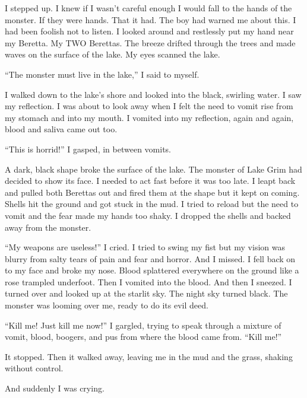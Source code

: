 I stepped up. I knew if I wasn't careful enough I would fall
to the hands of the monster. If they were hands. That it had. The
boy had warned me about this. I had been foolish not to listen. I
looked around and restlessly put my hand near my Beretta. My TWO
Berettas. The breeze drifted through the trees and made waves on
the surface of the lake. My eyes scanned the lake.



``The monster must live in the lake,'' I said to
myself.



I walked down to the lake's shore and looked into the black,
swirling water. I saw my reflection. I was about to look away when
I felt the need to vomit rise from my stomach and into my mouth. I
vomited into my reflection, again and again, blood and saliva came
out too.



``This is horrid!'' I gasped, in between vomits.



A dark, black shape broke the surface of the lake. The monster of
Lake Grim had decided to show its face. I needed to act fast before
it was too late. I leapt back and pulled both Berettas out and
fired them at the shape but it kept on coming. Shells hit the
ground and got stuck in the mud. I tried to reload but the need to
vomit and the fear made my hands too shaky. I dropped the shells
and backed away from the monster.



``My weapons are useless!'' I cried. I tried to swing my
fist but my vision was blurry from salty tears of pain and fear and
horror. And I missed. I fell back on to my face and broke my nose.
Blood splattered everywhere on the ground like a rose trampled
underfoot. Then I vomited into the blood. And then I sneezed. I
turned over and looked up at the starlit sky. The night sky turned
black. The monster was looming over me, ready to do its evil
deed.



``Kill me! Just kill me now!'' I gargled, trying to speak
through a mixture of vomit, blood, boogers, and pus from where the
blood came from. ``Kill me!''



It stopped. Then it walked away, leaving me in the mud and the
grass, shaking without control.



And suddenly I was crying. 
 



